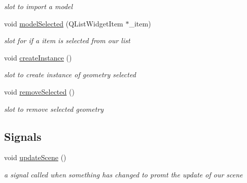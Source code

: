 \begin{DoxyCompactItemize}
\begin{DoxyCompactList}\small\item\em slot to import a model \end{DoxyCompactList}\item 
void \hyperlink{class_mesh_widget_afc878f28393e7e918e5d88f6a747d22a}{model\-Selected} (Q\-List\-Widget\-Item $\ast$\-\_\-item)
\begin{DoxyCompactList}\small\item\em slot for if a item is selected from our list \end{DoxyCompactList}\item 
\hypertarget{class_mesh_widget_a39e961759059b54abc380b149f0186f8}{void \hyperlink{class_mesh_widget_a39e961759059b54abc380b149f0186f8}{create\-Instance} ()}\label{class_mesh_widget_a39e961759059b54abc380b149f0186f8}

\begin{DoxyCompactList}\small\item\em slot to create instance of geometry selected \end{DoxyCompactList}\item 
\hypertarget{class_mesh_widget_a4e934e8f2eb83349fe0b865f4c242e3d}{void \hyperlink{class_mesh_widget_a4e934e8f2eb83349fe0b865f4c242e3d}{remove\-Selected} ()}\label{class_mesh_widget_a4e934e8f2eb83349fe0b865f4c242e3d}

\begin{DoxyCompactList}\small\item\em slot to remove selected geometry \end{DoxyCompactList}\end{DoxyCompactItemize}
\subsection*{Signals}
\begin{DoxyCompactItemize}
\item 
\hypertarget{class_mesh_widget_adfc6c88e47a65d0e41b7b1f4b4db216d}{void \hyperlink{class_mesh_widget_adfc6c88e47a65d0e41b7b1f4b4db216d}{update\-Scene} ()}\label{class_mesh_widget_adfc6c88e47a65d0e41b7b1f4b4db216d}

\begin{DoxyCompactList}\small\item\em a signal called when something has changed to promt the update of our scene \end{DoxyCompactList}\end{DoxyCompactItemize}
